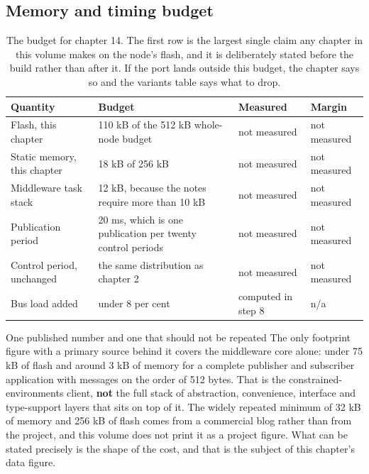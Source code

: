 
\subsection*{Memory and timing budget}

\begin{table}[H]\centering\small
\begin{tabular}{p{44mm}p{28mm}p{28mm}p{30mm}}
\toprule
Quantity & Budget & Measured & Margin \\
\midrule
Flash, this chapter & 110 kB of the 512 kB whole-node budget & not measured & not measured \\
Static memory, this chapter & 18 kB of 256 kB & not measured & not measured \\
Middleware task stack & 12 kB, because the notes require more than 10 kB & not measured & not measured \\
Publication period & 20 ms, which is one publication per twenty control periods & not measured & not measured \\
Control period, unchanged & the same distribution as chapter 2 & not measured & not measured \\
Bus load added & under 8 per cent & computed in step 8 & n/a \\
\bottomrule
\end{tabular}
\caption{The budget for chapter 14. The first row is the largest single claim any chapter in this volume makes on the node's flash, and it is deliberately stated before the build rather than after it. If the port lands outside this budget, the chapter says so and the variants table says what to drop.}
\end{table}

\begin{note}{One published number and one that should not be repeated}
The only footprint figure with a primary source behind it covers the middleware
core alone: under 75 kB of flash and around 3 kB of memory for a complete
publisher and subscriber application with messages on the order of 512 bytes.
That is the constrained-environments client, \textbf{not} the full stack of
abstraction, convenience, interface and type-support layers that sits on top of
it. The widely repeated minimum of 32 kB of memory and 256 kB of flash comes
from a commercial blog rather than from the project, and this volume does not
print it as a project figure. What can be stated precisely is the shape of the
cost, and that is the subject of this chapter's data figure.
\end{note}

